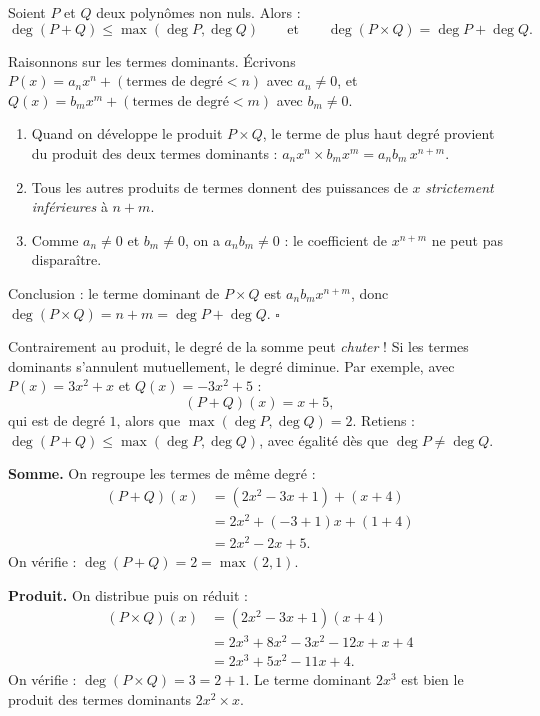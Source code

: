 \documentclass[11pt]{article}
\begin{document}
\begin{propriete}
Soient $P$ et $Q$ deux polynômes non nuls. Alors :
\[ \deg(P+Q) \leq \max(\deg P, \deg Q) \qquad \text{et} \qquad \deg(P \times Q) = \deg P + \deg Q. \]
\end{propriete}

\begin{experience}
Raisonnons sur les termes dominants. Écrivons $P(x) = a_n x^n + (\text{termes de degré} < n)$ avec $a_n \neq 0$, et $Q(x) = b_m x^m + (\text{termes de degré} < m)$ avec $b_m \neq 0$.
\begin{enumerate}
\item Quand on développe le produit $P \times Q$, le terme de plus haut degré provient du produit des deux termes dominants : $a_n x^n \times b_m x^m = a_n b_m\, x^{n+m}$.
\item Tous les autres produits de termes donnent des puissances de $x$ \emph{strictement inférieures} à $n+m$.
\item Comme $a_n \neq 0$ et $b_m \neq 0$, on a $a_n b_m \neq 0$ : le coefficient de $x^{n+m}$ ne peut pas disparaître.
\end{enumerate}
Conclusion : le terme dominant de $P \times Q$ est $a_n b_m x^{n+m}$, donc $\deg(P\times Q) = n + m = \deg P + \deg Q$. \hfill $\square$
\end{experience}

\begin{attention}
Contrairement au produit, le degré de la somme peut \emph{chuter} ! Si les termes dominants s'annulent mutuellement, le degré diminue. Par exemple, avec $P(x) = 3x^2 + x$ et $Q(x) = -3x^2 + 5$ :
\[ (P+Q)(x) = x + 5, \]
qui est de degré $1$, alors que $\max(\deg P, \deg Q) = 2$. Retiens : $\deg(P+Q) \leq \max(\deg P, \deg Q)$, avec égalité dès que $\deg P \neq \deg Q$.
\end{attention}

\begin{exemplebox}[Calculs avec $P(x) = 2x^2 - 3x + 1$ et $Q(x) = x + 4$]
\textbf{Somme.} On regroupe les termes de même degré :
\begin{align*}
(P+Q)(x) &= (2x^2 - 3x + 1) + (x + 4) \\
&= 2x^2 + (-3+1)x + (1+4) \\
&= 2x^2 - 2x + 5.
\end{align*}
On vérifie : $\deg(P+Q) = 2 = \max(2, 1)$.

\textbf{Produit.} On distribue puis on réduit :
\begin{align*}
(P \times Q)(x) &= (2x^2 - 3x + 1)(x + 4) \\
&= 2x^3 + 8x^2 - 3x^2 - 12x + x + 4 \\
&= 2x^3 + 5x^2 - 11x + 4.
\end{align*}
On vérifie : $\deg(P \times Q) = 3 = 2 + 1$. Le terme dominant $2x^3$ est bien le produit des termes dominants $2x^2 \times x$.
\end{exemplebox}
\end{document}
